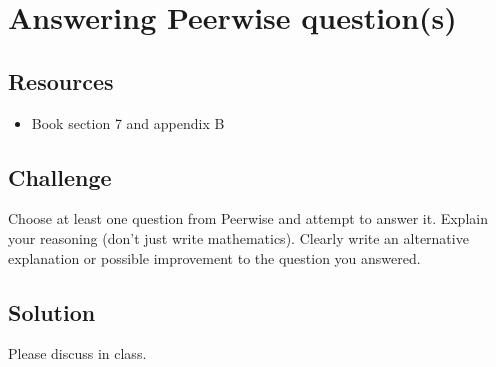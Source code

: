 \newpage
\section{Answering Peerwise question(s)}

\subsection*{Resources}
\begin{itemize}
    \item Book section 7 and appendix B
\end{itemize}

\subsection*{Challenge}
Choose at least one question from Peerwise and attempt to answer it.
Explain your reasoning (don't just write mathematics).
Clearly write an alternative explanation or possible improvement to the question you answered.

\subsection*{Solution}
Please discuss in class.
